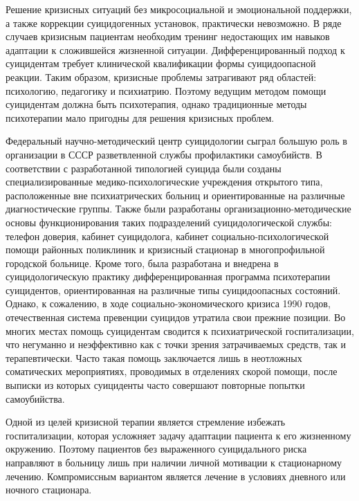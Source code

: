Решение кризисных ситуаций без микросоциальной и эмоциональной поддержки, а также коррекции суицидогенных установок, практически невозможно. В ряде случаев кризисным пациентам необходим тренинг недостающих им навыков адаптации к сложившейся жизненной ситуации. Дифференцированный подход к суицидентам требует клинической квалификации формы суицидоопасной реакции. Таким образом, кризисные проблемы затрагивают ряд областей: психологию, педагогику и психиатрию. Поэтому ведущим методом помощи суицидентам должна быть психотерапия, однако традиционные методы психотерапии мало пригодны для решения кризисных проблем.~\cite{starsen}

Федеральный научно-методический центр суицидологии сыграл большую роль в организации в СССР разветвленной службы профилактики самоубийств. В соответствии с разработанной типологией суицида были созданы специализированные медико-психологические учреждения открытого типа, расположенные вне психиатрических больниц и ориентированные на различные диагностические группы. Также были разработаны организационно-методические основы функционирования таких подразделений суицидологической службы: телефон доверия, кабинет суицидолога, кабинет социально-психологической помощи районных поликлиник и кризисный стационар в многопрофильной городской больнице. Кроме того, была разработана и внедрена в суицидологическую практику дифференцированная программа психотерапии суицидентов, ориентированная на различные типы суицидоопасных состояний. Однако, к сожалению, в ходе социально-экономического кризиса 1990 годов, отечественная система превенции суицидов утратила свои прежние позиции. Во многих местах помощь суицидентам сводится к психиатрической госпитализации, что негуманно и неэффективно как с точки зрения затрачиваемых средств, так и терапевтически. Часто такая помощь заключается лишь в неотложных соматических мероприятиях, проводимых в отделениях скорой помощи, после выписки из которых суициденты часто совершают повторные попытки самоубийства.~\cite{starsen}

Одной из целей кризисной терапии является стремление избежать госпитализации, которая усложняет задачу адаптации пациента к его жизненному окружению. Поэтому пациентов без выраженного суицидального риска направляют в больницу лишь при наличии личной мотивации к стационарному лечению. Компромиссным вариантом является лечение в условиях дневного или ночного стационара.

